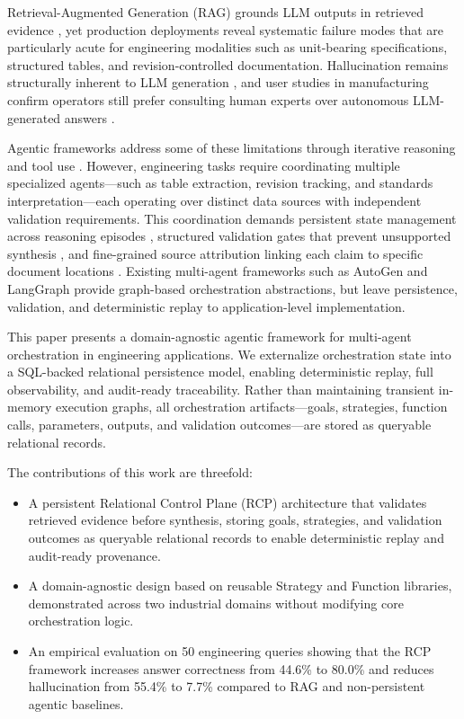 \documentclass[largeformat]{interact}
\begin{document}
Retrieval-Augmented Generation (RAG) grounds LLM outputs in retrieved evidence \cite{lewis2020rag}, yet production deployments reveal systematic failure modes
that are particularly acute for engineering modalities such as unit-bearing
specifications, structured tables, and revision-controlled documentation. Hallucination remains structurally inherent to LLM generation \cite{huang2025hallucinationsurvey, kalai2025hallucinate}, and user studies in manufacturing confirm operators still prefer consulting human experts over autonomous LLM-generated answers \cite{kernanfreire2024knowledge}.

Agentic frameworks address some of these limitations through iterative reasoning and tool use \cite{yao2023reactsynergizingreasoningacting, wang2024autonomousagents}. However, engineering tasks require coordinating multiple specialized agents—such as table extraction, revision tracking, and standards interpretation—each operating over distinct data sources with independent validation requirements. This coordination demands persistent state management across reasoning episodes \cite{packer2023memgpt}, structured validation gates that prevent unsupported synthesis \cite{madaan2023selfrefine}, and fine-grained source attribution linking each claim to specific document locations \cite{rashkin2023attribution}. Existing multi-agent frameworks such as AutoGen \cite{wu2024autogen} and LangGraph provide graph-based orchestration abstractions, but leave persistence, validation, and deterministic replay to application-level implementation.

This paper presents a domain-agnostic agentic framework for multi-agent orchestration in engineering applications. We externalize orchestration state into a SQL-backed relational persistence model, enabling deterministic replay, full observability, and audit-ready traceability. Rather than maintaining transient in-memory execution graphs, all orchestration artifacts—goals, strategies, function calls, parameters, outputs, and validation outcomes—are stored as queryable relational records.

\vspace{1em}
\noindent The contributions of this work are threefold:
\begin{itemize}[label=-]
    \item A persistent Relational Control Plane (RCP) architecture that validates retrieved evidence before synthesis, storing goals, strategies, and validation outcomes as queryable relational records to enable deterministic replay and audit-ready provenance.
    \item A domain-agnostic design based on reusable Strategy and Function libraries, demonstrated across two industrial domains without modifying core orchestration logic.
    \item An empirical evaluation on 50 engineering queries showing that the RCP framework increases answer correctness from 44.6\% to 80.0\% and reduces hallucination from 55.4\% to 7.7\% compared to RAG and non-persistent agentic baselines.
\end{itemize}
\end{document}
